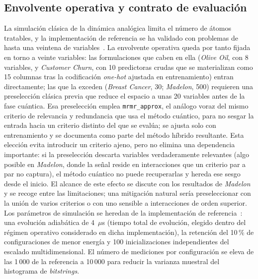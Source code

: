\subsection{Envolvente operativa y contrato de evaluación}
\label{sec:contrato}

La simulación clásica de la dinámica analógica limita el número de
átomos tratables, y la implementación de referencia se ha validado con
problemas de hasta una veintena de variables~\cite{orquin2026}. La
envolvente operativa queda por tanto fijada en torno a veinte
variables: las formulaciones que caben en ella (\textit{Olive Oil},
con 8 variables, y \textit{Customer Churn}, con 10 predictoras crudas
que se materializan como 15 columnas tras la codificación
\textit{one-hot} ajustada en entrenamiento) entran directamente; las
que la exceden (\textit{Breast Cancer}, 30;
\textit{Madelon}, 500) requieren una preselección clásica previa que
reduce el espacio a unas 20 variables antes de la fase cuántica. Esa
preselección emplea \texttt{mrmr\_approx}, el análogo voraz del mismo
criterio de relevancia y redundancia que usa el método cuántico, para no
sesgar la entrada hacia un criterio distinto del que se evalúa; se ajusta
solo con entrenamiento y se documenta como parte del método híbrido
resultante. Esta elección evita introducir un criterio ajeno, pero no
elimina una dependencia importante: si la preselección descarta variables
verdaderamente relevantes (algo posible en \textit{Madelon}, donde la
señal reside en interacciones que un criterio par a par no captura), el
método cuántico no puede recuperarlas y hereda ese sesgo desde el inicio.
El alcance de este efecto se discute con los resultados de \textit{Madelon}
y se recoge entre las limitaciones; una mitigación natural sería
preseleccionar con la unión de varios criterios o con uno sensible a
interacciones de orden superior. Los parámetros de simulación se heredan
de la implementación de referencia~\cite{orquin2026}: una evolución
adiabática de 4~$\mu$s (tiempo total de evolución, elegido dentro del
régimen operativo considerado en dicha implementación), la retención del
10\,\% de configuraciones de menor
energía y 100
inicializaciones independientes del escalado multidimensional. El número
de mediciones por configuración se eleva de las 1\,000 de la referencia
a 10\,000 para reducir la varianza muestral del histograma de
\textit{bitstrings}.

